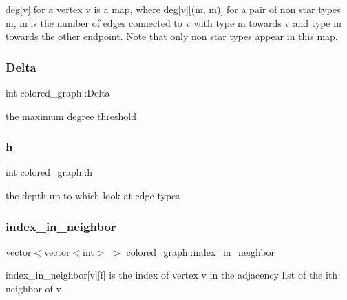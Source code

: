 deg\mbox{[}v\mbox{]} for a vertex v is a map, where deg\mbox{[}v\mbox{]}\mbox{[}(m, m\textquotesingle{})\mbox{]} for a pair of non star types m, m\textquotesingle{} is the number of edges connected to v with type m towards v and type m\textquotesingle{} towards the other endpoint. Note that only non star types appear in this map. 

\mbox{\label{classcolored__graph_a5b0e93eb40a20dc815c809dee11edc12}} 
\subsubsection{\texorpdfstring{Delta}{Delta}}
{\footnotesize\ttfamily int colored\+\_\+graph\+::\+Delta}



the maximum degree threshold 

\mbox{\label{classcolored__graph_ae27062a4ee59df2670d3a0c81e85a3fa}} 
\subsubsection{\texorpdfstring{h}{h}}
{\footnotesize\ttfamily int colored\+\_\+graph\+::h}



the depth up to which look at edge types 

\mbox{\label{classcolored__graph_ae28fcd089f9785204d76b6a608bed54f}} 
\subsubsection{\texorpdfstring{index\+\_\+in\+\_\+neighbor}{index\_in\_neighbor}}
{\footnotesize\ttfamily vector$<$vector$<$int$>$ $>$ colored\+\_\+graph\+::index\+\_\+in\+\_\+neighbor}



index\+\_\+in\+\_\+neighbor\mbox{[}v\mbox{]}\mbox{[}i\mbox{]} is the index of vertex v in the adjacency list of the ith neighbor of v 

